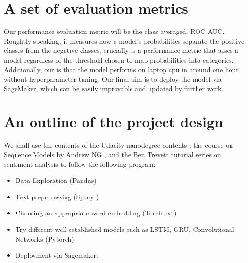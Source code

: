 \documentclass[book,preprintnumbers,11pt]{article}
\begin{document}
\section{A set of evaluation metrics}

Our performance evaluation metric will be the class averaged, ROC AUC. Roughtly speaking, it measures 
how a model's probabilities separate the positive classes  from the negative classes, crucially
is a performance metric that asses a model regardless of the threshold chosen to map probabilities into categories. Additionally, our  is that the model performs on laptop cpu in around one hour without hyperparameter tuning. Our final aim is to deploy the model via SageMaker, which can be easily improvable and updated by further work.


\section{An outline of the project design}

We shall use the contents of the Udacity nanodegree contents \cite{ND}, 
the course on Sequence Models by Andrew NG \cite{NG}, and the 
Ben Trevett tutorial  series on sentiment analysis \cite{BT} to follow the following program:
\begin{itemize}
\item Data Exploration (Pandas)
\item Text preprocessing (Spacy \cite{Spacy})
\item Choosing an appropriate word-embedding (Torchtext)
\item Try different well established models such as LSTM, GRU, Convolutional Networks (Pytorch)
\item Deployment via Sagemaker.
\end{itemize}



\end{document}
